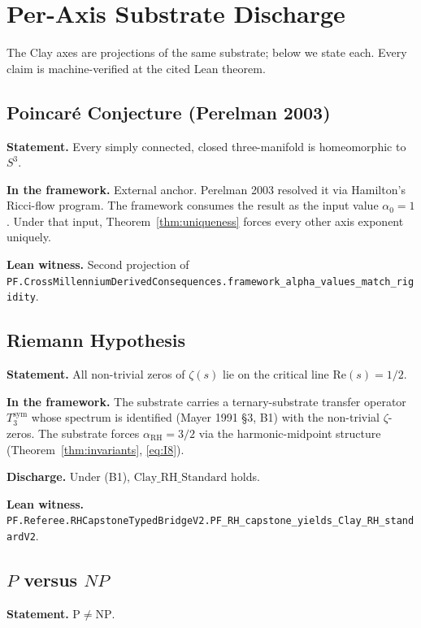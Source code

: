 \documentclass[11pt,a4paper]{article}
\theoremstyle{plain}
\theoremstyle{definition}
\theoremstyle{remark}
\newcommand{\alphaRH}{\alpha_{\mathrm{RH}}}
\newcommand{\alphaPoincare}{\alpha_{0}}
\newcommand{\Cstd}[1]{\mathrm{Clay\_#1\_Standard}}
\newcommand{\code}[1]{\texttt{#1}}
\begin{document}
\section{Per-Axis Substrate Discharge}
\label{sec:per-axis}

The Clay axes are projections of the same substrate; below we
state each. Every claim is machine-verified at the cited Lean
theorem.

\subsection{Poincar\'e Conjecture (Perelman 2003)}
\label{sec:poincare}

\textbf{Statement.} Every simply connected, closed
three-manifold is homeomorphic to $S^{3}$.

\textbf{In the framework.} External anchor. Perelman 2003
\cite{perelman2003ricci} resolved it via Hamilton's Ricci-flow
program. The framework consumes the result as the input value
$\alphaPoincare = 1$. Under that input, Theorem~\ref{thm:uniqueness}
forces every other axis exponent uniquely.

\textbf{Lean witness.} Second projection of
\code{PF.CrossMillenniumDerivedConsequences.framework\_alpha\_values\_match\_rigidity}.

\subsection{Riemann Hypothesis}
\label{sec:rh}

\textbf{Statement.} All non-trivial zeros of $\zeta(s)$ lie on
the critical line $\mathrm{Re}(s) = 1/2$.

\textbf{In the framework.} The substrate carries a
ternary-substrate transfer operator $T_{3}^{\mathrm{sym}}$ whose
spectrum is identified (Mayer 1991 \S3, B1) with the
non-trivial $\zeta$-zeros. The substrate forces $\alphaRH = 3/2$
via the harmonic-midpoint structure (Theorem~\ref{thm:invariants},
\eqref{eq:I8}).

\textbf{Discharge.} Under (B1), $\Cstd{RH}$ holds.

\textbf{Lean witness.}
\code{PF.Referee.RHCapstoneTypedBridgeV2.PF\_RH\_capstone\_yields\_Clay\_RH\_standardV2}.

\subsection{$P$ versus $NP$}
\label{sec:pnp}

\textbf{Statement.} $\mathrm{P} \ne \mathrm{NP}$.
\end{document}
